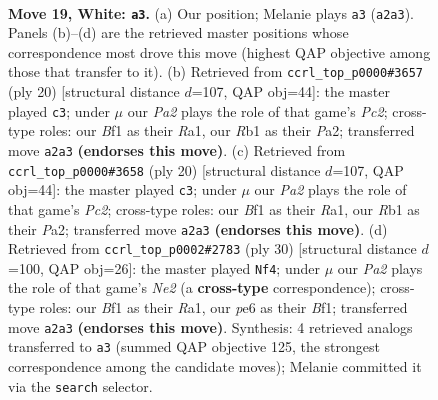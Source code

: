 \documentclass[11pt]{article}
\begin{document}
\clearpage

\begin{figure}[p]\centering
\begin{subfigure}{0.46\textwidth}\centering
\resizebox{\linewidth}{!}{%
\newchessgame
\chessboard[
  setfen={rnbqr3/2pn1kpp/1p2p3/p2pPp2/3P1P1P/6Q1/PPPKN1P1/1R3BNR w - - 2 19},
  showmover=false,
  pgfstyle=straightmove, color=movearrow, markmove={a2-a3}
]}
\caption{}
\end{subfigure}\hfill
\begin{subfigure}{0.46\textwidth}\centering
\resizebox{\linewidth}{!}{%
\newchessgame
\chessboard[
  setfen={r2qkb1r/pp1n1pp1/2p1p3/3pP2p/3P3n/3N4/PPPN1PPP/R1BQ1RK1 w kq - 1 11},
  showmover=false,
  pgfstyle=straightmove, color=movearrow, markmove={c2-c3}
]}
\caption{}
\end{subfigure}
\\[4pt]
\begin{subfigure}{0.46\textwidth}\centering
\resizebox{\linewidth}{!}{%
\newchessgame
\chessboard[
  setfen={r2qkb1r/pp1n1pp1/2p1p3/3pP2p/3P3n/3N4/PPPN1PPP/R1BQ1RK1 w kq - 1 11},
  showmover=false,
  pgfstyle=straightmove, color=movearrow, markmove={c2-c3}
]}
\caption{}
\end{subfigure}\hfill
\begin{subfigure}{0.46\textwidth}\centering
\resizebox{\linewidth}{!}{%
\newchessgame
\chessboard[
  setfen={r3nrk1/ppqn1pp1/2p1p1b1/4P2p/P1NP2PP/5P2/1P1QN3/R3KB1R w KQ - 1 16},
  showmover=false,
  pgfstyle=straightmove, color=movearrow, markmove={e2-f4}
]}
\caption{}
\end{subfigure}
\caption{\textbf{Move 19, White: \texttt{a3}.} (a) Our position; Melanie plays \texttt{a3} (\texttt{a2a3}). Panels (b)--(d) are the retrieved master positions whose correspondence most drove this move (highest QAP objective among those that transfer to it). (b) Retrieved from \texttt{ccrl\_top\_p0000\#3657} (ply 20) [structural distance $d$=107, QAP obj=44]: the master played \texttt{c3}; under $\mu$ our \emph{Pa2} plays the role of that game's \emph{Pc2}; cross-type roles: our \emph{B}f1 as their \emph{R}a1, our \emph{R}b1 as their \emph{P}a2; transferred move \texttt{a2a3} \textbf{(endorses this move)}. (c) Retrieved from \texttt{ccrl\_top\_p0000\#3658} (ply 20) [structural distance $d$=107, QAP obj=44]: the master played \texttt{c3}; under $\mu$ our \emph{Pa2} plays the role of that game's \emph{Pc2}; cross-type roles: our \emph{B}f1 as their \emph{R}a1, our \emph{R}b1 as their \emph{P}a2; transferred move \texttt{a2a3} \textbf{(endorses this move)}. (d) Retrieved from \texttt{ccrl\_top\_p0002\#2783} (ply 30) [structural distance $d$=100, QAP obj=26]: the master played \texttt{Nf4}; under $\mu$ our \emph{Pa2} plays the role of that game's \emph{Ne2} (a \textbf{cross-type} correspondence); cross-type roles: our \emph{B}f1 as their \emph{R}a1, our \emph{p}e6 as their \emph{B}f1; transferred move \texttt{a2a3} \textbf{(endorses this move)}. Synthesis: 4 retrieved analogs transferred to \texttt{a3} (summed QAP objective 125, the strongest correspondence among the candidate moves); Melanie committed it via the \texttt{search} selector.}
\label{fig:thought-m36}
\end{figure}
\end{document}
